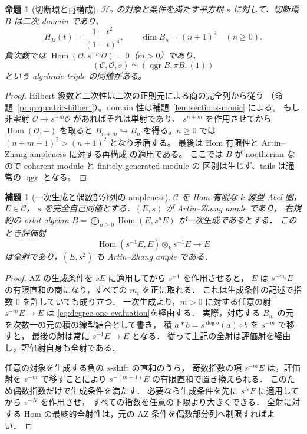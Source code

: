 \documentclass[a4paper,11pt]{ltjsarticle}
\numberwithin{equation}{section}
\theoremstyle{plain}
\newtheorem{proposition}[theorem]{命題}
\newtheorem{lemma}[theorem]{補題}
\theoremstyle{definition}
\theoremstyle{remark}
\newcommand{\OO}{\mathcal O}
\newcommand{\cC}{\mathcal C}
\newcommand{\HH}{\mathcal H_2}
\DeclareMathOperator{\Hom}{Hom}
\DeclareMathOperator{\qgr}{qgr}
\begin{document}
\begin{proposition}[切断環と再構成]
\label{prop:reconstruction}
$\HH$ の対象と条件を満たす平方根 $s$ に対して、切断環 $B$ は二次 domain であり、
\[
 H_B(t)=\frac{1-t^2}{(1-t)^4},\qquad \dim B_n=(n+1)^2\quad(n\ge0).
\]
負次数では $\Hom(\OO,s^{-m}\OO)=0$（$m>0$）であり、
\[
 (\cC,\OO,s)\simeq(\qgr B,\pi B,(1))
\]
という algebraic triple の同値がある。
\end{proposition}
\begin{proof}
Hilbert 級数と二次性は二次の正則元による商の完全列から従う
（命題~\ref{prop:quadric-hilbert}）。domain 性は補題~\ref{lem:sections-monic} による。
もし非零射 $\OO\to s^{-m}\OO$ があればそれは単射であり、
$s^{n+m}$ を作用させてから $\Hom(\OO,-)$ を取ると
$B_{n+m}\hookrightarrow B_n$ を得る。$n\ge0$ では
$(n+m+1)^2>(n+1)^2$ となり矛盾する。
最後は Hom 有限性と Artin--Zhang ampleness に対する再構成
\cite[Theorem 2.6(2)]{MU2021} の適用である。
ここでは $B$ が noetherian なので coherent module と finitely generated module の
区別は生じず、tails は通常の $\qgr$ となる。
\end{proof}

\begin{lemma}[一次生成と偶数部分列の ampleness]
\label{lem:ample-square-from-generation}
$\mathcal C$ を Hom 有限な $k$ 線型 Abel 圏，$E\in\mathcal C$，
$s$ を完全自己同値とする．$(E,s)$ が Artin--Zhang ample であり，
右規約の orbit algebra
$B=\bigoplus_{n\ge0}\operatorname{Hom}(E,s^nE)$ が一次生成であるとする．
このとき評価射
\[
 \operatorname{Hom}(s^{-1}E,E)\otimes_k s^{-1}E\longrightarrow E
 \tag{E}\label{eq:degree-one-evaluation}
\]
は全射であり，$(E,s^2)$ も Artin--Zhang ample である．
\end{lemma}
\begin{proof}
AZ の生成条件を $sE$ に適用してから $s^{-1}$ を作用させると，
$E$ は $s^{-m_i}E$ の有限直和の商になり，すべての $m_i$ を正に取れる．
これは生成条件の記述で指数 $0$ を許していても成り立つ．
一次生成より，$m>0$ に対する任意の射 $s^{-m}E\to E$ は
\eqref{eq:degree-one-evaluation}を経由する．
実際，対応する $B_m$ の元を次数一の元の積の線型結合として書き，
積 $a*b=s^{\deg b}(a)\circ b$ を $s^{-m}$ で移すと，
最後の射は常に $s^{-1}E\to E$ となる．
従って上記の全射は評価射を経由し，評価射自身も全射である．

任意の対象を生成する負の $s$-shift の直和のうち，
奇数指数の項 $s^{-m}E$ は，評価射を $s^{-m}$ で移すことにより
$s^{-(m+1)}E$ の有限直和で置き換えられる．
このため偶数指数だけで生成条件を満たす．
必要なら生成条件を先に $s^N F$ に適用してから $s^{-N}$ を作用させ，
すべての指数を任意の下限より大きくできる．
全射に対する Hom の最終的全射性は，元の AZ 条件を偶数部分列へ制限すればよい．
\end{proof}
\end{document}
